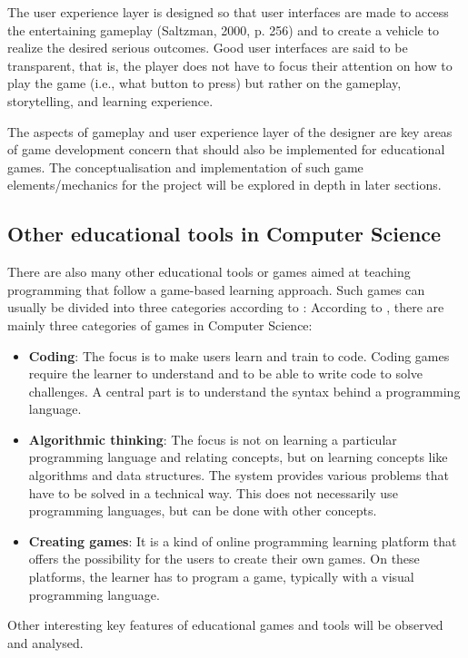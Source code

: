 The user experience layer is designed so that user interfaces are made to access the entertaining gameplay (Saltzman, 2000, p. 256) and to create a vehicle to realize the desired serious outcomes. Good user interfaces are said to be transparent, that is, the player does not have to focus their attention on how to play the game (i.e., what button to press) but rather on the gameplay, storytelling, and learning experience.

The aspects of gameplay and user experience layer of the designer are key areas of game development concern that should also be implemented for educational games. The conceptualisation and implementation of such game elements/mechanics for the project will be explored in depth in later sections.

\subsection{Other educational tools in Computer Science}
There are also many other educational tools or games aimed at teaching programming that follow a game-based learning approach. Such games can usually be divided into three categories according to \cite{combefis2016learning}:
According to \cite{combefis2016learning}, there are mainly three categories of games in Computer Science:
\begin{itemize}
    \item \textbf{Coding}: The focus is to make users learn and train to code. Coding games require the learner to understand and to be able to write code to solve challenges. A central part is to understand the syntax behind a programming language.
    \item \textbf{Algorithmic thinking}: The focus is not on learning a particular programming language and relating concepts, but on learning concepts like algorithms and data structures. The system provides various problems that have to be solved in a technical way. This does not necessarily use programming languages, but can be done with other concepts.
    \item \textbf{Creating games}:  It is a kind of online programming learning platform that offers the possibility for the users to create their own games. On these platforms, the learner has to program a game, typically with a visual programming language. 
\end{itemize}

Other interesting key features of educational games and tools will be observed and analysed.

